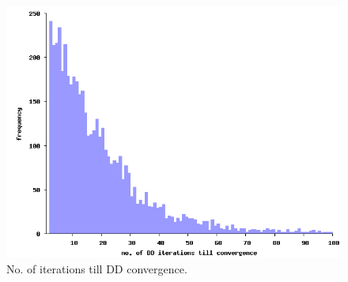 \begin{figure}[t]
\begin{center}
\includegraphics[width=\columnwidth]{histogram.png}
\caption{No. of iterations till DD convergence.}
\label{fig:histo}
\end{center}
\end{figure}



%
%
%
